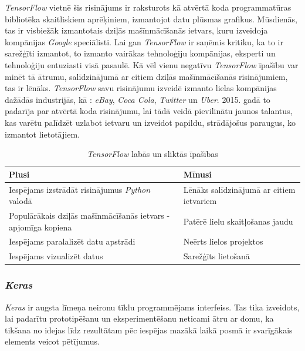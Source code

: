 \textit{TensorFlow} vietnē \cite{tensor1} šis risinājums ir raksturots kā atvērtā koda programmatūras bibliotēka skaitliskiem aprēķiniem, izmantojot datu plūsmas grafikus. Mūsdienās, tas ir visbiežāk izmantotais dziļās mašīnmācīšanās ietvars, kuru izveidoja kompānijas \textit{Google} speciālisti. Lai gan \textit{TensorFlow} ir saņēmis kritiku, ka to ir sarežģīti izmantot, to izmanto vairākas tehnoloģiju kompānijas, eksperti un tehnoloģiju entuziasti visā pasaulē. Kā vēl vienu negatīvu \textit{TensorFlow} īpašību var minēt tā ātrumu, salīdzinājumā ar citiem dziļās mašīnmācīšanās risinājumiem, tas ir \cite{tensor2} lēnāks. \textit{TensorFlow} savu risinājumu izveidē izmanto lielas kompānijas dažādās industrijās, kā : \textit{eBay}, \textit{Coca Cola}, \textit{Twitter} un \textit{Uber}. 2015. gadā to padarīja par atvērtā koda risinājumu, lai tādā veidā pievilinātu jaunos talantus, kas varētu palīdzēt uzlabot ietvaru un izveidot papildu, strādājošus paraugus, ko izmantot lietotājiem. 

	\begin{table}[ht!]	
	\centering
	\begin{tabular}{ |p{7cm}|p{7cm}| }
		\hline
		\textbf{Plusi} & \textbf{Mīnusi}\\ \hline
		Iespējams izstrādāt risinājumus \textit{Python} valodā & Lēnāks salīdzinājumā ar citiem ietvariem \\ \hline 
		Populārākais dziļās mašīnmācīšanās ietvars - apjomīga kopiena & Patērē lielu skaitļošanas jaudu \\ \hline
		Iespējams paralalizēt datu apstrādi  & Neērts lielos projektos \\  \hline
		Iespējams vizualizēt datus & Sarežģīts lietošanā\\ \hline
	\end{tabular}
\caption{\textit{TensorFlow} labās un sliktās īpašības}
\end{table}


\subsubsection{\textit{Keras}}

\textit{Keras} ir augsta līmeņa neironu tīklu programmējams interfeiss. Tas tika izveidots, lai padarītu prototipēšanu un eksperimentēšanu neticami ātru ar domu, ka tikšana no idejas līdz rezultātam pēc iespējas mazākā laikā posmā ir svarīgākais elements veicot pētījumus.

